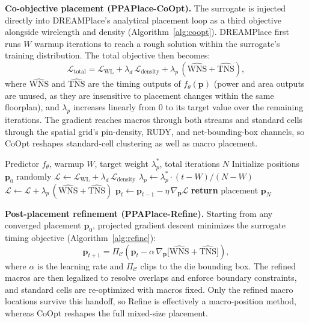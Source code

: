 \documentclass[sigconf,anonymous,review,9pt]{acmart}
\begin{document}
\textbf{Co-objective placement (PPAPlace-CoOpt).}
The surrogate is injected directly into DREAMPlace's analytical
placement loop as a third objective alongside wirelength and density
(Algorithm~\ref{alg:coopt}). DREAMPlace first runs $W$ warmup
iterations to reach a rough solution within the surrogate's training
distribution. The total objective then becomes:
\begin{equation}
\label{eq:coopt}
\mathcal{L}_{\mathrm{total}} = \mathcal{L}_{\mathrm{WL}}
  + \lambda_d\,\mathcal{L}_{\mathrm{density}}
  + \lambda_p\,(\widehat{\mathrm{WNS}} + \widehat{\mathrm{TNS}}),
\end{equation}
where $\widehat{\mathrm{WNS}}$ and $\widehat{\mathrm{TNS}}$ are the
timing outputs of $f_\theta(\mathbf{p})$ (power and area outputs are
unused, as they are insensitive to placement changes within the same
floorplan), and $\lambda_p$ increases linearly from 0 to its target value over
the remaining iterations. The gradient reaches macros through both
streams and standard cells through the spatial grid's pin-density,
RUDY, and net-bounding-box channels, so CoOpt reshapes standard-cell
clustering as well as macro placement.

\begin{algorithm}[h]
\caption{PPAPlace-CoOpt Co-Objective Placement}
\label{alg:coopt}
\footnotesize
\begin{algorithmic}[1]
\REQUIRE Predictor $f_\theta$, warmup $W$, target weight $\lambda_p^*$,
  total iterations $N$
\STATE Initialize positions $\mathbf{p}_0$ randomly
  \STATE $\mathcal{L} \leftarrow \mathcal{L}_{\mathrm{WL}}
    + \lambda_d\,\mathcal{L}_{\mathrm{density}}$
    \hfill{}
    \STATE $\lambda_p \leftarrow \lambda_p^* \cdot (t - W) / (N - W)$
      \hfill{}
    \STATE $\mathcal{L} \leftarrow \mathcal{L}
      + \lambda_p\,(\widehat{\mathrm{WNS}} + \widehat{\mathrm{TNS}})$
      \hfill{}
  \ENDIF
  \STATE $\mathbf{p}_t \leftarrow \mathbf{p}_{t-1}
    - \eta\,\nabla_{\mathbf{p}}\mathcal{L}$
    \hfill{}
\ENDFOR
\STATE \textbf{return} placement $\mathbf{p}_N$
\end{algorithmic}
\end{algorithm}

\textbf{Post-placement refinement (PPAPlace-Refine).}
Starting from any converged placement $\mathbf{p}_0$, projected
gradient descent minimizes the surrogate timing objective
(Algorithm~\ref{alg:refine}):
\begin{equation}
\label{eq:refine}
\mathbf{p}_{t+1} = \Pi_\mathcal{C}\!\left(\mathbf{p}_t
  - \alpha\,\nabla_{\mathbf{p}}
  \big[\widehat{\mathrm{WNS}} + \widehat{\mathrm{TNS}}\big]\right),
\end{equation}
where $\alpha$ is the learning rate and $\Pi_\mathcal{C}$ clips to
the die bounding box. The refined macros are then legalized to resolve overlaps and enforce
boundary constraints, and standard cells are re-optimized
with macros fixed. Only the refined macro locations survive this
handoff, so Refine is effectively a macro-position method, whereas
CoOpt reshapes the full mixed-size placement.
\end{document}
